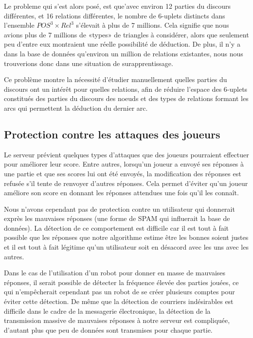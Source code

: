 \documentclass[a4paper,11pt,french]{article}
\begin{document}
Le probleme qui s'est alors posé, est que'avec environ 12 parties du discours différentes, et 16 relations différentes, le nombre de
6-uplets distincts dans l'ensemble $POS^3\times Rel^3$ s'élevait à plus de 7 millions. Cela signifie que nous avions plus de 7 millions de
«types» de triangles à considérer, alors que seulement peu d'entre eux montraient une réelle possibilité de déduction. De plus, il n'y a
dans la base de données qu'environ un million de relations existantes, nous nous trouverions donc dans une situation de surapprentissage.

Ce problème montre la nécessité d'étudier manuellement quelles parties du discours ont un intérêt pour quelles relations, afin de réduire
l'espace des 6-uplets constitués des parties du discours des noeuds et des types de relations formant les arcs qui permettent la déduction
du dernier arc.


\subsection{Protection contre les attaques des joueurs}

Le serveur prévient quelques types d'attaques que des joueurs pourraient effectuer pour améliorer leur score. Entre autres, lorsqu'un joueur
a envoyé ses réponses à une partie et que ses scores lui ont été envoyés, la modification des réponses est refusée s'il tente de renvoyer
d'autres réponses. Cela permet d'éviter qu'un joueur améliore son score en donnant les réponses attendues une fois qu'il les connaît.

Nous n'avons cependant pas de protection contre un utilisateur qui donnerait exprès les mauvaises réponses (une forme de SPAM qui influerait
la base de données). La détection de ce comportement est difficile car il est tout à fait possible que les réponses que notre algorithme
estime être les bonnes soient justes et il est tout à fait légitime qu'un utilisateur soit en désacord avec les uns avec les autres.

Dans le cas de l'utilisation d'un robot pour donner en masse de mauvaises réponses, il serait possible de détecter la fréquence élevée des
parties jouées, ce qui n'empêcherait cependant pas un robot de se créer plusieurs comptes pour éviter cette détection. De même que la
détection de courriers indésirables est difficile dans le cadre de la messagerie électronique, la détection de la transmission massive de
mauvaises réponses à notre serveur est compliquée, d'autant plus que peu de données sont transmises pour chaque partie.
\end{document}
